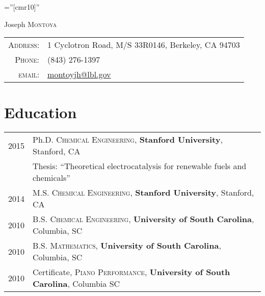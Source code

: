 \documentclass[a4paper,10pt]{article}
\begin{document}

\pagestyle{empty} %

\font\fb=''[cmr10]'' %

\par{\centering
		{\Huge Joseph \textsc{Montoya}
	}\bigskip\par}


\begin{tabular}{rl}
    \textsc{Address:}   & 1 Cyclotron Road, M/S 33R0146, Berkeley, CA 94703 \\
    \textsc{Phone:}     & (843) 276-1397\\
    \textsc{email:}     & \href{mailto:montoyjh@lbl.gov}{montoyjh@lbl.gov}
\end{tabular}

\section{Education}
\begin{tabular}{ll}	
2015 & Ph.D. \textsc{Chemical Engineering}, \textbf{Stanford University}, Stanford, CA\\
& Thesis: ``Theoretical electrocatalysis for renewable fuels and chemicals'' \vspace{0.1in} \\
2014 & M.S. \textsc{Chemical Engineering}, \textbf{Stanford University}, Stanford, CA \vspace{0.1in} \\
2010 & B.S. \textsc{Chemical Engineering}, \textbf{University of South Carolina}, Columbia, SC\\
2010 & B.S. \textsc{Mathematics}, \textbf{University of South Carolina}, Columbia, SC\\
2010 & Certificate, \textsc{Piano Performance}, \textbf{University of South Carolina}, Columbia SC
\end{tabular}
\vspace{0.2in}
\end{document}
